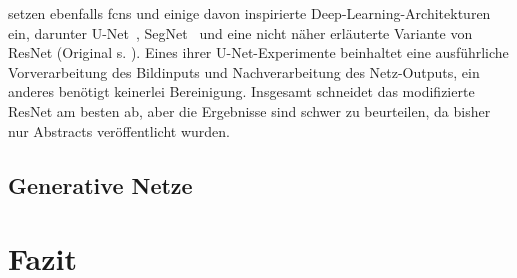 \citeauthor{Wang.2018c} \cite{Wang.2018d,Wang.2018b,Wang.2018,Wang.2018c} setzen ebenfalls \glspl{fcn} und einige davon inspirierte Deep-Learning-Architekturen ein, darunter U-Net~\cite{Ronneberger.2015}, SegNet~\cite{Badrinarayanan.2017} und eine nicht näher erläuterte Variante von ResNet (Original s. \cite{He.2016}).
Eines ihrer U-Net-Experimente beinhaltet eine ausführliche Vorverarbeitung des Bildinputs und Nachverarbeitung des Netz-Outputs, ein anderes benötigt keinerlei Bereinigung.
Insgesamt schneidet das modifizierte ResNet am besten ab, aber die Ergebnisse sind schwer zu beurteilen, da bisher nur Abstracts veröffentlicht wurden.



\subsection{Generative Netze}





\section{Fazit}


